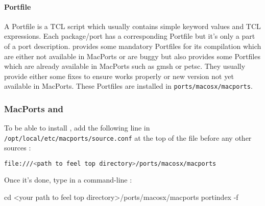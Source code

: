 \paragraph{Portfile}
A Portfile is a TCL script which usually contains simple keyword values and TCL
expressions. Each package/port has a corresponding Portfile but it's only a part
of a port description.  \feel provides some mandatory Portfiles for its
compilation which are either not available in MacPorts or are buggy but \feel
also provides some Portfiles which are already available in MacPorts such as
gmsh or petsc. They usually provide either some fixes to ensure \feel works
properly or new version not yet available in MacPorts.  These Portfiles are
installed in \lstinline|ports/macosx/macports|.


\subsubsection{MacPorts and \Feel}


To be able to install \feel, add the following line in \lstinline|/opt/local/etc/macports/source.conf|
at the top of the file before any other sources :
\begin{lstlisting}[language=sh]
file:///<path to feel top directory>/ports/macosx/macports
\end{lstlisting}

Once it's done, type in a command-line :
\begin{unixcom}
		cd <your path to feel top directory>/ports/macosx/macports
		portindex -f
\end{unixcom}

